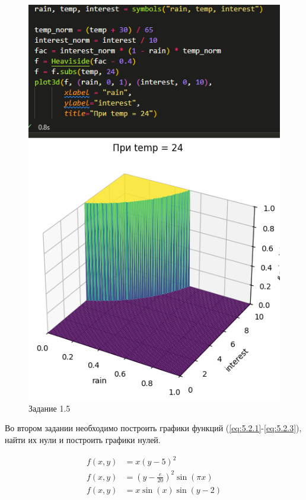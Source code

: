 \documentclass[14pt,a4paper]{extarticle}
\begin{document}
\begin{figure}
    [ht!]\centering
    \includegraphics[width=0.6\linewidth]{figures/5.1/5.png}
    \caption{Задание 1.5}
    \label{pic:5.1.5}
\end{figure}
\newpage

Во втором задании необходимо построить графики функций (\ref{eq:5.2.1}-\ref{eq:5.2.3}), найти
их нули и построить графики нулей.

\begin{align}
    \label{eq:5.2.1}
    f(x, y) &= x(y - 5) ^ 2 \\
    \label{eq:5.2.2}
    f(x, y) &= (y - \frac{e}{20})^2 \sin(\pi x) \\
    \label{eq:5.2.3}
    f(x, y) &= x \sin (x) \sin(y - 2)
\end{align}
\end{document}
